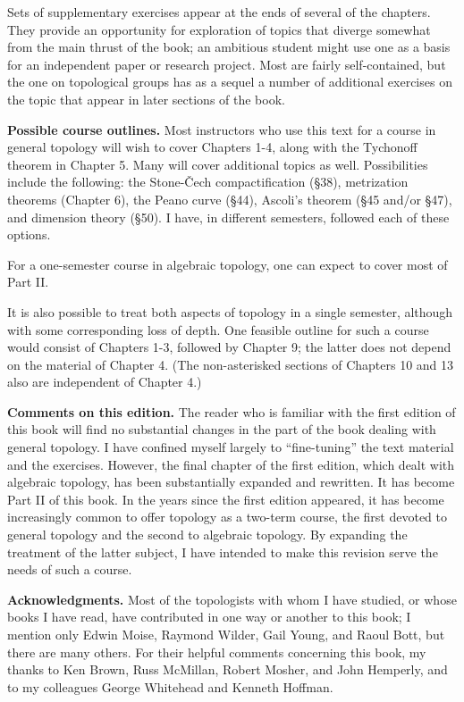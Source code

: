 Sets of supplementary exercises appear at the ends of several of the chapters. 
They provide an opportunity for exploration of topics that diverge somewhat from 
the main thrust of the book; an ambitious student might use one as a basis for an 
independent paper or research project. Most are fairly self-contained, but the one 
on topological groups has as a sequel a number of additional exercises on the topic 
that appear in later sections of the book.

\noindent\textbf{Possible course outlines. }Most instructors who use this text for a 
course in general topology will wish to cover Chapters 1-4, along with the Tychonoff 
theorem in Chapter 5. Many will cover additional topics as well. Possibilities include 
the following: the Stone-Čech compactification (\S38), metrization theorems 
(Chapter 6), the Peano curve (\S44), Ascoli's theorem (\S45 and/or \S47), and 
dimension theory (\S50). I have, in different semesters, followed each of these options.

For a one-semester course in algebraic topology, one can expect to cover most of Part II.

It is also possible to treat both aspects of topology in a single semester, although 
with some corresponding loss of depth. One feasible outline for such a course would 
consist of Chapters 1-3, followed by Chapter 9; the latter does not depend on the 
material of Chapter 4. (The non-asterisked sections of Chapters 10 and 13 also are 
independent of Chapter 4.)

\noindent\textbf{Comments on this edition.} The reader who is familiar with the first 
edition of this book will find no substantial changes in the part of the book dealing 
with general topology. I have confined myself largely to ``fine-tuning'' the text 
material and the exercises. However, the final chapter of the first edition, which 
dealt with algebraic topology, has been substantially expanded and rewritten. It has 
become Part II of this book. In the years since the first edition appeared, it has 
become increasingly common to offer topology as a two-term course, the first devoted 
to general topology and the second to algebraic topology. By expanding the treatment 
of the latter subject, I have intended to make this revision serve the needs of such 
a course.

\noindent\textbf{Acknowledgments. }Most of the topologists with whom I have studied, 
or whose books I have read, have contributed in one way or another to this book; 
I mention only Edwin Moise, Raymond Wilder, Gail Young, and Raoul Bott, but there 
are many others. For their helpful comments concerning this book, my thanks to Ken 
Brown, Russ McMillan, Robert Mosher, and John Hemperly, and to my colleagues George 
Whitehead and Kenneth Hoffman.

